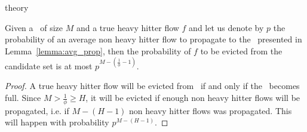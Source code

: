 \begin{maybeappendix}{theory}
\begin{lemma}
\label{lemma:eve}
Given a \cs\ of size $M$ and a true heavy hitter flow $f$ and let us denote by $p$ the probability of an average non heavy hitter flow to propagate to the \cs\ presented in Lemma~\ref{lemma:avg_prop}, then the probability of $f$ to be evicted from the candidate set is at most $p^{M-(\frac{1}{\phi}-1)}$.
\end{lemma}
\begin{proof}
A true heavy hitter flow will be evicted from \cs\ if and only if the \cs\ becomes full. Since $M > \frac{1}{\phi} \geq H$, it will be evicted if enough non heavy hitter flows will be propagated, i.e. if $M-(H-1)$ non heavy hitter flows was propagated. This will happen with probability $p^{M-(H-1)}$.
\end{proof}

\end{maybeappendix}